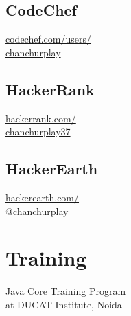 \documentclass[]{hieudo-build}
\begin{document}
\begin{minipage}[t]{0.3\textwidth}
\subsection{CodeChef} \href{https://www.codechef.com/users/chanchurplay}{codechef.com/users/\\chanchurplay} \\
\subsection{HackerRank} \href{https://www.hackerrank.com/chanchurplay37}{hackerrank.com/\\chanchurplay37} \\
\subsection{HackerEarth} \href{https://www.hackerearth.com/@chanchurplay}{hackerearth.com/\\@chanchurplay} \\

\sectionsep



\section{Training}
Java Core Training Program\\
at DUCAT Institute, Noida \\
\sectionsep



\end{minipage}
\end{document}
